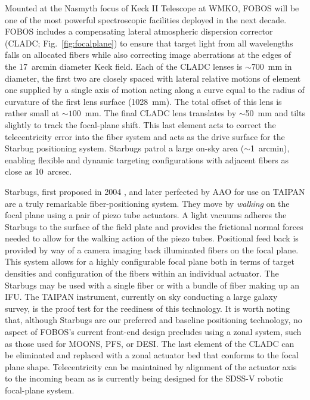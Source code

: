 Mounted at the Nasmyth focus of Keck II Telescope at WMKO, FOBOS will
be one of the most powerful spectroscopic facilities deployed in the
next decade. FOBOS includes a compensating lateral atmospheric
dispersion corrector (CLADC; Fig.~\ref{fig:focalplane}) to ensure
that target light from all wavelengths falls on allocated fibers
while also correcting image aberrations at the edges of the 17~arcmin
diameter Keck field. Each of the CLADC lenses is $\sim$700~mm in
diameter, the first two are closely spaced with lateral relative
motions of element one supplied by a single axis of motion acting
along a curve equal to the radius of curvature of the first lens
surface (1028~mm). The total offset of this lens is rather small at
$\sim1$00~mm. The final CLADC lens translates by $\sim$50~mm and
tilts slightly to track the focal-plane shift. This last element acts to
correct the telecentricity error into the fiber system and acts as the
drive surface for the Starbug positioning system.
Starbugs patrol a large on-sky area ($\sim$1~arcmin), enabling
flexible and dynamic targeting configurations with adjacent fibers as
close as 10~arcsec.


Starbugs, first proposed in 2004 \citep{2004SPIE.5495..600M}, and
later perfected by AAO for use on TAIPAN \citep{2016SPIE.9912E..1WS}
are a truly remarkable fiber-positioning system. They move by {\it
walking} on the focal plane using a pair of piezo tube actuators. A
light vacuums adheres the Starbugs to the surface of the field plate
and provides the frictional normal forces needed to allow for the
walking action of the piezo tubes. Positional feed back is provided
by way of a camera imaging back illuminated fibers on the focal
plane. This system allows for a highly configurable focal plane both
in terms of target densities and configuration of the fibers within
an individual actuator. The Starbugs may be used with a single fiber
or with a bundle of fiber making up an IFU. The TAIPAN instrument,
currently on sky conducting a large galaxy survey, is the proof test
for the reediness of this technology. It is worth noting that,
although Starbugs are our preferred and baseline positioning
technology, no aspect of FOBOS's current front-end design precludes
using a zonal system, such as those used for MOONS, PFS, or DESI. The
last element of the CLADC can be eliminated and replaced with a zonal
actuator bed that conforms to the focal plane shape. Telecentricity can
be maintained by alignment of the actuator axis to the incoming beam
as is currently being designed for the SDSS-V robotic focal-plane
system.


